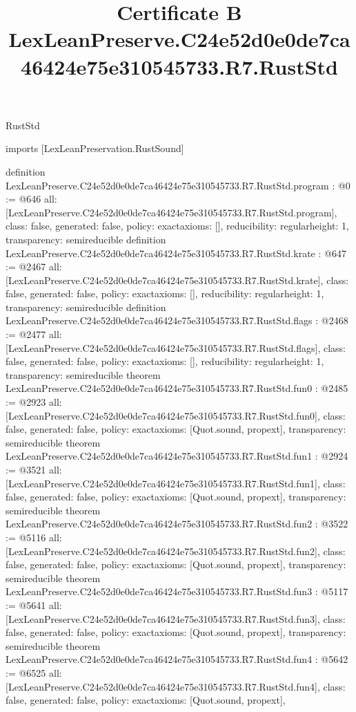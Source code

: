\begin{lexlean}{RustStd}
\title{Certificate B LexLeanPreserve.C24e52d0e0de7ca46424e75e310545733.R7.RustStd}
\begin{coremodule}
imports [LexLeanPreservation.RustSound]

definition LexLeanPreserve.C24e52d0e0de7ca46424e75e310545733.R7.RustStd.program : @0 := @646 {
  all: [LexLeanPreserve.C24e52d0e0de7ca46424e75e310545733.R7.RustStd.program],
  class: false,
  generated: false,
  policy: exact{axioms: []},
  reducibility: regular{height: 1},
  transparency: semireducible
}
definition LexLeanPreserve.C24e52d0e0de7ca46424e75e310545733.R7.RustStd.krate : @647 := @2467 {
  all: [LexLeanPreserve.C24e52d0e0de7ca46424e75e310545733.R7.RustStd.krate],
  class: false,
  generated: false,
  policy: exact{axioms: []},
  reducibility: regular{height: 1},
  transparency: semireducible
}
definition LexLeanPreserve.C24e52d0e0de7ca46424e75e310545733.R7.RustStd.flags : @2468 := @2477 {
  all: [LexLeanPreserve.C24e52d0e0de7ca46424e75e310545733.R7.RustStd.flags],
  class: false,
  generated: false,
  policy: exact{axioms: []},
  reducibility: regular{height: 1},
  transparency: semireducible
}
theorem LexLeanPreserve.C24e52d0e0de7ca46424e75e310545733.R7.RustStd.fun0 : @2485 := @2923 {
  all: [LexLeanPreserve.C24e52d0e0de7ca46424e75e310545733.R7.RustStd.fun0],
  class: false,
  generated: false,
  policy: exact{axioms: [Quot.sound, propext]},
  transparency: semireducible
}
theorem LexLeanPreserve.C24e52d0e0de7ca46424e75e310545733.R7.RustStd.fun1 : @2924 := @3521 {
  all: [LexLeanPreserve.C24e52d0e0de7ca46424e75e310545733.R7.RustStd.fun1],
  class: false,
  generated: false,
  policy: exact{axioms: [Quot.sound, propext]},
  transparency: semireducible
}
theorem LexLeanPreserve.C24e52d0e0de7ca46424e75e310545733.R7.RustStd.fun2 : @3522 := @5116 {
  all: [LexLeanPreserve.C24e52d0e0de7ca46424e75e310545733.R7.RustStd.fun2],
  class: false,
  generated: false,
  policy: exact{axioms: [Quot.sound, propext]},
  transparency: semireducible
}
theorem LexLeanPreserve.C24e52d0e0de7ca46424e75e310545733.R7.RustStd.fun3 : @5117 := @5641 {
  all: [LexLeanPreserve.C24e52d0e0de7ca46424e75e310545733.R7.RustStd.fun3],
  class: false,
  generated: false,
  policy: exact{axioms: [Quot.sound, propext]},
  transparency: semireducible
}
theorem LexLeanPreserve.C24e52d0e0de7ca46424e75e310545733.R7.RustStd.fun4 : @5642 := @6525 {
  all: [LexLeanPreserve.C24e52d0e0de7ca46424e75e310545733.R7.RustStd.fun4],
  class: false,
  generated: false,
  policy: exact{axioms: [Quot.sound, propext]},
}
\end{coremodule}
\end{lexlean}
